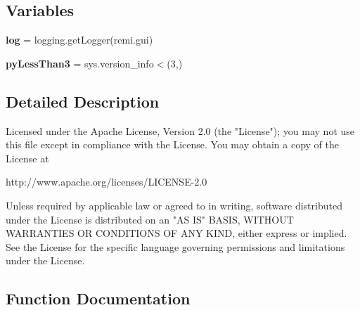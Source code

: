 \subsection*{Variables}
\begin{DoxyCompactItemize}
\item 
{\bfseries log} = logging.\+get\+Logger(\textquotesingle{}remi.\+gui\textquotesingle{})\hypertarget{namespaceremi_1_1gui_a3ebee511a0f36c6fa8dbb75c86c30006}{}\label{namespaceremi_1_1gui_a3ebee511a0f36c6fa8dbb75c86c30006}

\item 
{\bfseries py\+Less\+Than3} = sys.\+version\+\_\+info$<$(3,)\hypertarget{namespaceremi_1_1gui_ac5e2b698878f6981752921128b5db921}{}\label{namespaceremi_1_1gui_ac5e2b698878f6981752921128b5db921}

\end{DoxyCompactItemize}


\subsection{Detailed Description}
\begin{DoxyVerb}   Licensed under the Apache License, Version 2.0 (the "License");
   you may not use this file except in compliance with the License.
   You may obtain a copy of the License at

       http://www.apache.org/licenses/LICENSE-2.0

   Unless required by applicable law or agreed to in writing, software
   distributed under the License is distributed on an "AS IS" BASIS,
   WITHOUT WARRANTIES OR CONDITIONS OF ANY KIND, either express or implied.
   See the License for the specific language governing permissions and
   limitations under the License.
\end{DoxyVerb}
 

\subsection{Function Documentation}
